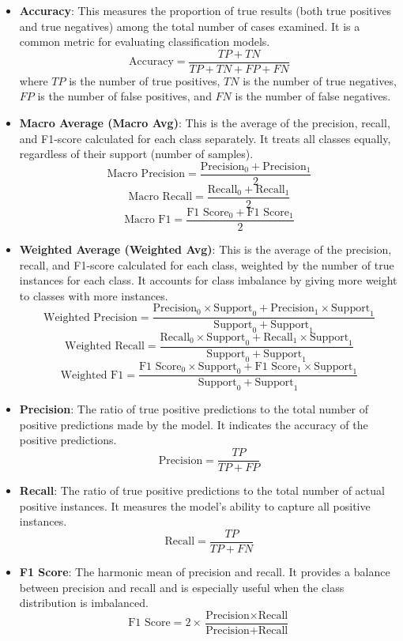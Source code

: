 \documentclass[a4paper,12pt]{article}
\begin{document}
\begin{itemize}
    \item \textbf{Accuracy}: This measures the proportion of true results (both true positives and true negatives) among the total number of cases examined. It is a common metric for evaluating classification models.
    \[
    \text{Accuracy} = \frac{TP + TN}{TP + TN + FP + FN}
    \]
    where \( TP \) is the number of true positives, \( TN \) is the number of true negatives, \( FP \) is the number of false positives, and \( FN \) is the number of false negatives.

    \item \textbf{Macro Average (Macro Avg)}: This is the average of the precision, recall, and F1-score calculated for each class separately. It treats all classes equally, regardless of their support (number of samples).
    \[
    \text{Macro Precision} = \frac{\text{Precision}_0 + \text{Precision}_1}{2}
    \]
    \[
    \text{Macro Recall} = \frac{\text{Recall}_0 + \text{Recall}_1}{2}
    \]
    \[
    \text{Macro F1} = \frac{\text{F1 Score}_0 + \text{F1 Score}_1}{2}
    \]

    \item \textbf{Weighted Average (Weighted Avg)}: This is the average of the precision, recall, and F1-score calculated for each class, weighted by the number of true instances for each class. It accounts for class imbalance by giving more weight to classes with more instances.
    \[
    \text{Weighted Precision} = \frac{\text{Precision}_0 \times \text{Support}_0 + \text{Precision}_1 \times \text{Support}_1}{\text{Support}_0 + \text{Support}_1}
    \]
    \[
    \text{Weighted Recall} = \frac{\text{Recall}_0 \times \text{Support}_0 + \text{Recall}_1 \times \text{Support}_1}{\text{Support}_0 + \text{Support}_1}
    \]
    \[
    \text{Weighted F1} = \frac{\text{F1 Score}_0 \times \text{Support}_0 + \text{F1 Score}_1 \times \text{Support}_1}{\text{Support}_0 + \text{Support}_1}
    \]

    \item \textbf{Precision}: The ratio of true positive predictions to the total number of positive predictions made by the model. It indicates the accuracy of the positive predictions.
    \[
    \text{Precision} = \frac{TP}{TP + FP}
    \]

    \item \textbf{Recall}: The ratio of true positive predictions to the total number of actual positive instances. It measures the model's ability to capture all positive instances.
    \[
    \text{Recall} = \frac{TP}{TP + FN}
    \]

    \item \textbf{F1 Score}: The harmonic mean of precision and recall. It provides a balance between precision and recall and is especially useful when the class distribution is imbalanced.
    \[
    \text{F1 Score} = 2 \times \frac{\text{Precision} \times \text{Recall}}{\text{Precision} + \text{Recall}}
    \]
\end{itemize}
\end{document}
